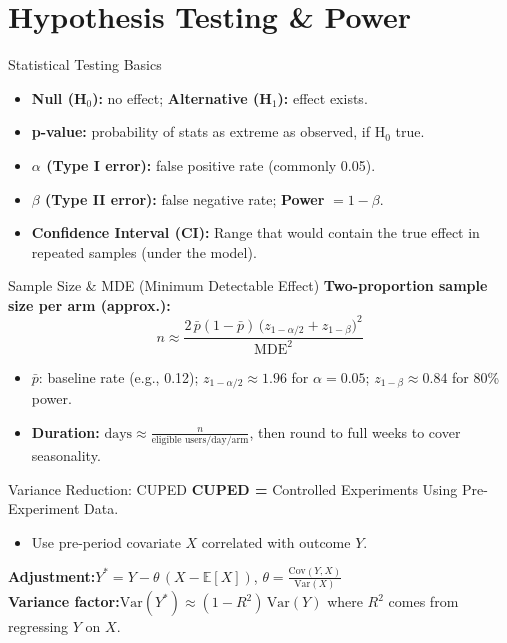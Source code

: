 \documentclass[aspectratio=169]{beamer}
\begin{document}
\section{Hypothesis Testing \& Power}
\begin{frame}{Statistical Testing Basics}
  \begin{itemize}
    \item \textbf{Null (H$_0$):} no effect; \textbf{Alternative (H$_1$):} effect exists.
    \item \textbf{p-value:} probability of stats as extreme as observed, if H$_0$ true.
    \item \textbf{$\alpha$ (Type I error):} false positive rate (commonly 0.05).
    \item \textbf{$\beta$ (Type II error):} false negative rate; \textbf{Power} $=1-\beta$.
    \item \textbf{Confidence Interval (CI):} Range that would contain the true effect in repeated samples (under the model).
  \end{itemize}
\end{frame}

\begin{frame}{Sample Size \& MDE (Minimum Detectable Effect)}
  \textbf{Two-proportion sample size per arm (approx.):}
  \[
    n \approx \frac{2\,\bar{p}(1-\bar{p})\,\big(z_{1-\alpha/2}+z_{1-\beta}\big)^2}{\text{MDE}^2}
  \]
  \begin{itemize}
    \item $\bar{p}$: baseline rate (e.g., 0.12); $z_{1-\alpha/2}\approx1.96$ for $\alpha=0.05$; $z_{1-\beta}\approx0.84$ for 80\% power.
    \item \textbf{Duration:} $ \text{days} \approx \frac{n}{\text{eligible users/day/arm}} $, then round to full weeks to cover seasonality.
  \end{itemize}
\end{frame}

\begin{frame}{Variance Reduction: CUPED}
  \textbf{CUPED =} Controlled Experiments Using Pre-Experiment Data.
  \begin{itemize}
    \item Use pre-period covariate $X$ correlated with outcome $Y$.
  \end{itemize}
  \vspace{0.5em}
  \textbf{Adjustment:}\quad $Y^* = Y - \theta\,(X-\mathbb{E}[X])$, \quad $\theta=\frac{\mathrm{Cov}(Y,X)}{\mathrm{Var}(X)}$\\[0.5em]
  \textbf{Variance factor:}\quad $\mathrm{Var}(Y^*) \approx (1-R^2)\,\mathrm{Var}(Y)$ where $R^2$ comes from regressing $Y$ on $X$.
\end{frame}
\end{document}
